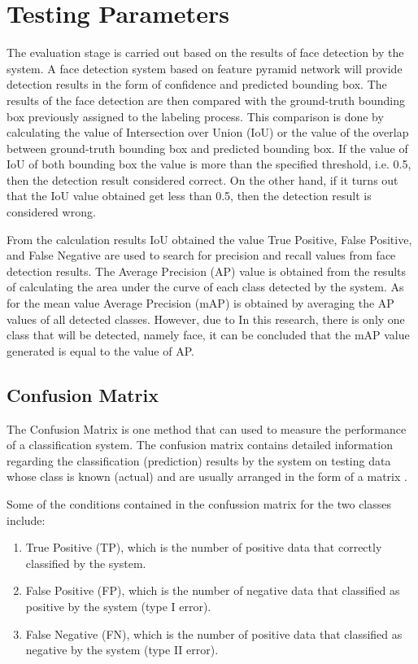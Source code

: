 \section{Testing Parameters}
\label{sec:parameterpengujian}

The evaluation stage is carried out based on the results of face detection by the system.
A face detection system based on feature pyramid network
will provide detection results in the form of confidence and predicted bounding box.
The results of the face detection are then compared with the ground-truth bounding box
previously assigned to the labeling process.
This comparison is done by calculating the value of Intersection over Union (IoU)
or the value of the overlap between ground-truth bounding box
and predicted bounding box.
If the value of IoU of both bounding box
the value is more than the specified threshold,
i.e. 0.5, then the detection result
considered correct. On the other hand, if it turns out that the IoU value obtained
get less than 0.5, then the detection result is considered
wrong.

From the calculation results IoU obtained the value True Positive,
False Positive, and False Negative are used to search for precision and recall values from face detection results.
The Average Precision (AP) value is obtained from the results of calculating the area under the curve of
each class detected by the system. As for the mean value
Average Precision (mAP) is obtained by averaging the AP values of all detected classes.
However, due to
In this research, there is only one class that will be detected, namely face,
it can be concluded that the mAP value
generated is equal to the value of AP.


\subsection{Confusion Matrix}

The Confusion Matrix is one method that can
used to measure the performance of a classification system. 
The confusion matrix contains detailed information regarding the classification (prediction) results by the system on testing data whose class is known
(actual) and are usually arranged in the form of a matrix \citep{haykin2009neural}.

Some of the conditions contained in the confussion matrix for the two classes include:

\begin{enumerate}
  \item True Positive (TP), which is the number of positive data that
  correctly classified by the system.
  \item False Positive (FP), which is the number of negative data that
  classified as positive by the system (type I error).
  \item False Negative (FN), which is the number of positive data that
  classified as negative by the system (type II error).
\end{enumerate}

